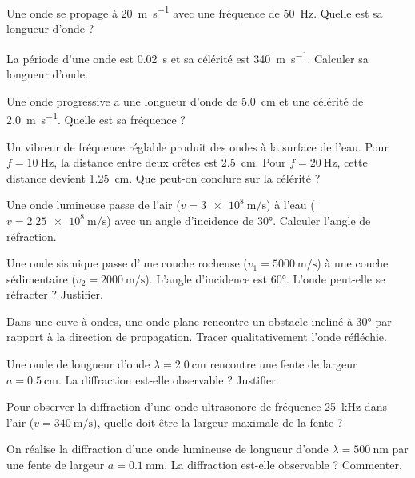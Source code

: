 
\exo{} Une onde se propage à \SI{20}{\metre\per\second} avec une fréquence de \SI{50}{\hertz}. Quelle est sa longueur d'onde ?

\exo{} La période d'une onde est \SI{0.02}{\second} et sa célérité est \SI{340}{\metre\per\second}. Calculer sa longueur d'onde.

\exo{} Une onde progressive a une longueur d'onde de \SI{5.0}{\centi\metre} et une célérité de \SI{2.0}{\metre\per\second}. Quelle est sa fréquence ?

\exo{} Un vibreur de fréquence réglable produit des ondes à la surface de l'eau. Pour $f = \SI{10}{\hertz}$, la distance entre deux crêtes est \SI{2.5}{\centi\metre}. Pour $f = \SI{20}{\hertz}$, cette distance devient \SI{1.25}{\centi\metre}. Que peut-on conclure sur la célérité ?


\exo{} Une onde lumineuse passe de l'air ($v = \SI{3e8}{\metre\per\second}$) à l'eau ($v = \SI{2.25e8}{\metre\per\second}$) avec un angle d'incidence de \ang{30}. Calculer l'angle de réfraction.

\exo{} Une onde sismique passe d'une couche rocheuse ($v_1 = \SI{5000}{\metre\per\second}$) à une couche sédimentaire ($v_2 = \SI{2000}{\metre\per\second}$). L'angle d'incidence est \ang{60}. L'onde peut-elle se réfracter ? Justifier.

\exo{} Dans une cuve à ondes, une onde plane rencontre un obstacle incliné à \ang{30} par rapport à la direction de propagation. Tracer qualitativement l'onde réfléchie.


\exo{} Une onde de longueur d'onde $\lambda = \SI{2.0}{\centi\metre}$ rencontre une fente de largeur $a = \SI{0.5}{\centi\metre}$. La diffraction est-elle observable ? Justifier.

\exo{} Pour observer la diffraction d'une onde ultrasonore de fréquence \SI{25}{\kilo\hertz} dans l'air ($v = \SI{340}{\metre\per\second}$), quelle doit être la largeur maximale de la fente ?

\exo{} On réalise la diffraction d'une onde lumineuse de longueur d'onde $\lambda = \SI{500}{\nano\metre}$ par une fente de largeur $a = \SI{0.1}{\milli\metre}$. La diffraction est-elle observable ? Commenter.


